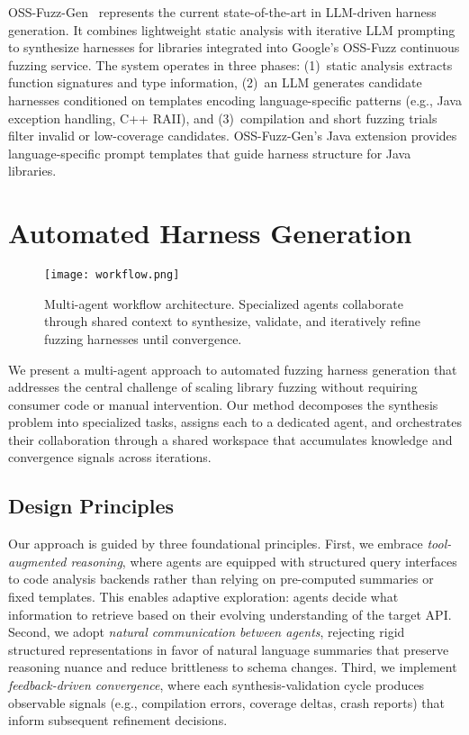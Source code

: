 \documentclass[sigconf,review,anonymous]{acmart}
\begin{document}
OSS-Fuzz-Gen~\cite{CITE:OSSFuzzGen} represents the current state-of-the-art in LLM-driven harness generation. It combines lightweight static analysis with iterative LLM prompting to synthesize harnesses for libraries integrated into Google's OSS-Fuzz continuous fuzzing service. The system operates in three phases: (1)~static analysis extracts function signatures and type information, (2)~an LLM generates candidate harnesses conditioned on templates encoding language-specific patterns (e.g., Java exception handling, C++ RAII), and (3)~compilation and short fuzzing trials filter invalid or low-coverage candidates.
OSS-Fuzz-Gen's Java extension provides language-specific prompt templates that guide harness structure for Java libraries. 




\section{Automated Harness Generation}

\begin{figure*}[t]
    \centering
    \texttt{[image: workflow.png]}
    \caption{Multi-agent workflow architecture. Specialized agents collaborate through shared context to synthesize, validate, and iteratively refine fuzzing harnesses until convergence.}
    \label{fig:methodology:system-overview}
\end{figure*}

We present a multi-agent approach to automated fuzzing harness generation that addresses the central challenge of scaling library fuzzing without requiring consumer code or manual intervention. Our method decomposes the synthesis problem into specialized tasks, assigns each to a dedicated agent, and orchestrates their collaboration through a shared workspace that accumulates knowledge and convergence signals across iterations.

\subsection{Design Principles}

Our approach is guided by three foundational principles. First, we embrace \emph{tool-augmented reasoning}, where agents are equipped with structured query interfaces to code analysis backends rather than relying on pre-computed summaries or fixed templates. This enables adaptive exploration: agents decide what information to retrieve based on their evolving understanding of the target API. Second, we adopt \emph{natural communication between agents}, rejecting rigid structured representations in favor of natural language summaries that preserve reasoning nuance and reduce brittleness to schema changes. Third, we implement \emph{feedback-driven convergence}, where each synthesis-validation cycle produces observable signals (e.g., compilation errors, coverage deltas, crash reports) that inform subsequent refinement decisions.
\end{document}

